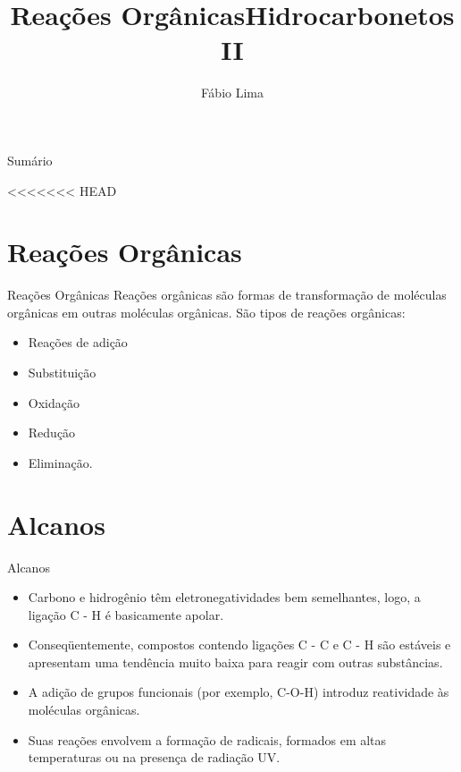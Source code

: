 \documentclass[presentation,professionalfonts,aspectratio=169]{beamer}
\date{}
\author{Fábio Lima}
\date{}
\title{Reações Orgânicas}
\title{Hidrocarbonetos II}
\begin{document}
\begingroup
  \maketitle
  \endgroup
\begin{frame}{Sumário}
\tableofcontents
\end{frame}


<<<<<<< HEAD
\section{Reações Orgânicas}
\label{sec:org900f9ed}
\begin{frame}[label={sec:org502dc3f}]{Reações Orgânicas}
Reações orgânicas são formas de transformação de moléculas orgânicas em outras moléculas orgânicas. São tipos de reações orgânicas:
\begin{itemize}
\item Reações de adição
\item Substituição
\item Oxidação
\item Redução
\item Eliminação.
\end{itemize}
\end{frame}

\section{Alcanos}
\label{sec:org3b1a34e}

\begin{frame}[label={sec:org9525017}]{Alcanos}
\begin{itemize}
\item Carbono e hidrogênio têm eletronegatividades bem semelhantes, logo, a ligação C - H é basicamente apolar.
\item Conseqüentemente, compostos contendo ligações C - C e C - H são estáveis e apresentam uma tendência muito baixa para reagir com outras substâncias.
\item A adição de grupos funcionais (por exemplo, C-O-H) introduz reatividade às moléculas orgânicas.
\item Suas reações envolvem a formação de radicais, formados em altas temperaturas ou na presença de radiação UV.
\end{itemize}
\end{frame}
\end{document}
